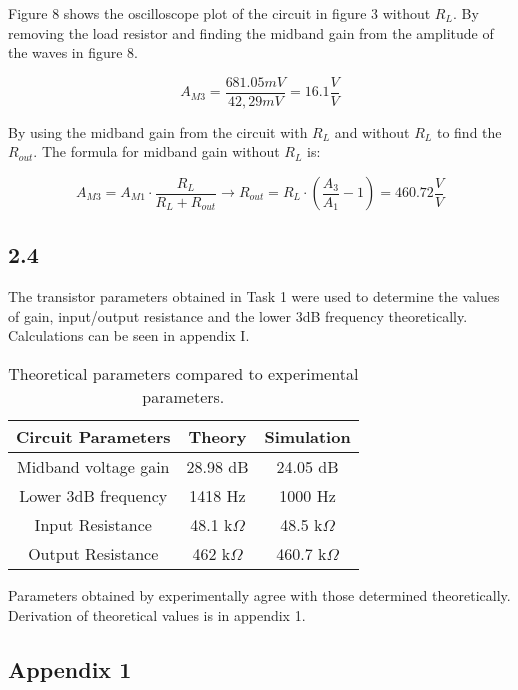 	Figure 8 shows the oscilloscope plot of the circuit in figure 3 without $R_{L}$. By removing the load resistor and finding the midband gain from the amplitude of the waves in figure 8.


	$$ A_{M3} = \frac{681.05 mV}{42,29 mV} = 16.1 \frac{V}{V} $$

	By using the midband gain from the circuit with $R_{L}$ and without $R_{L}$ to find the $R_{out}$. The formula for midband gain without $R_{L}$ is:


	$$ A_{M3} = A_{M1} \cdot \frac{R_{L}}{R_{L} + R_{out}} \rightarrow R_{out} = R_{L} \cdot (\frac{A_{3}}{A_{1}}-1) = 460.72 \frac{V}{V}$$

\pagebreak




\subsection*{2.4}

The transistor parameters obtained in Task 1 were used to determine the values of gain, input/output resistance and the lower 3dB frequency theoretically. Calculations can be seen in appendix I.\\

\begin{table}[htbp]
    \centering
        \begin{tabular}{ c | c | c }
        \hline
        Circuit Parameters     &   Theory                  & Simulation \\
        \hline
        Midband voltage gain    &   28.98 dB			    &   24.05 dB\\
        Lower 3dB frequency     &   1418 Hz                &   1000 Hz\\
        Input Resistance        &   48.1 k$\Omega$           &   48.5 k$\Omega$\\
        Output Resistance       &   462 k$\Omega$            &   460.7 k$\Omega$\\
        \end{tabular}%
    \caption{Theoretical parameters compared to experimental parameters.}
    \label{tab:addlabel}%
\end{table}%

Parameters obtained by experimentally agree with those determined theoretically. Derivation of theoretical values is in appendix 1.


\pagebreak
\subsection*{Appendix 1}
\begin{figure}[h!]
\end{figure}
